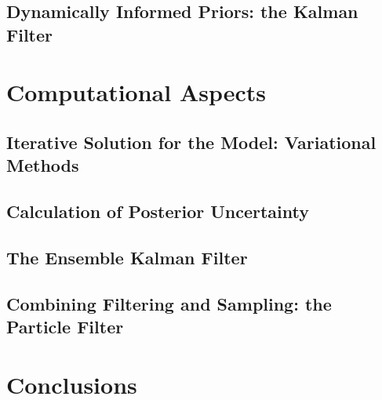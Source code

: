 \subsection{Dynamically Informed Priors: the Kalman Filter}
\label{rayner:inverse_problem:kf}

\section{Computational Aspects}
\label{rayner:computation}

\subsection{Iterative Solution for the Model: Variational Methods}
\label{rayner:computation:vars}

\subsection{Calculation of Posterior Uncertainty}
\label{rayner:computation:posterior}

\subsection{The Ensemble Kalman Filter}
\label{rayner:computation:enkf}

\subsection{Combining Filtering and Sampling: the Particle Filter}
\label{rayner:computation:particle}

\section{Conclusions}
\label{rayner:conclusions}




